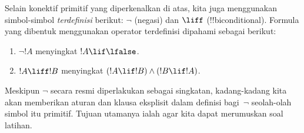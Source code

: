 \documentclass[../../../include/open-logic-section]{subfiles}
\begin{document}
Selain konektif primitif yang diperkenalkan di atas, kita juga menggunakan
simbol-simbol \emph{terdefinisi} berikut: $\lnot$ (negasi) dan $\liff$
(!!{biconditional}). Formula yang dibentuk menggunakan operator terdefinisi
dipahami sebagai berikut:
\begin{enumerate}
\item $\lnot !A$ menyingkat $!A \lif \lfalse$.

\item $!A \liff !B$ menyingkat $(!A \lif !B) \land (!B \lif !A)$.
\end{enumerate}

Meskipun $\lnot$ secara resmi diperlakukan sebagai singkatan, kadang-kadang
kita akan memberikan aturan dan klausa eksplisit dalam definisi bagi~$\lnot$
seolah-olah simbol itu primitif. Tujuan utamanya ialah agar kita dapat
merumuskan soal latihan.
\end{document}
